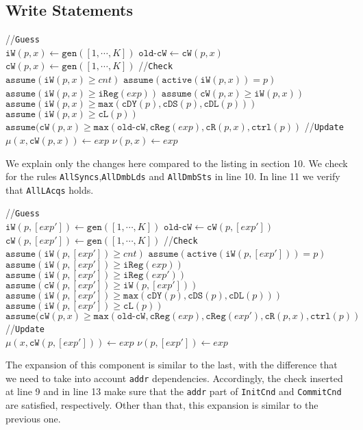 \documentclass{article}
\newcommand{\var}{\texttt}
\begin{document}
\subsection{Write Statements}
\begin{algorithm}[H]
  \SetAlgoLined
  //\var{Guess}\\
  $\var{iW}(p,x) \gets \var{gen}([1,\cdots,K])$\;
  $\var{old-cW} \gets \var{cW}(p,x)$\;
  $\var{cW}(p,x) \gets \var{gen}([1,\cdots,K])$\;
  //\var{Check}\\
  $\var{assume}(\var{iW}(p,x) \geq cnt)$\;
  $\var{assume}(\var{active}(\var{iW}(p,x)) = p)$\;
  $\var{assume}(\var{iW}(p,x) \geq \var{iReg}(exp))$\;
  $\var{assume}(\var{cW}(p,x) \geq \var{iW}(p,x))$\;
  $\var{assume}(\var{iW}(p,x) \geq \var{max}(\var{cDY}(p),\var{cDS}(p),\var{cDL}(p)))$\;
  $\var{assume}(\var{iW}(p,x) \geq \var{cL}(p))$\;
  $\var{assume}(\var{cW}(p,x) \geq \var{max}(\var{old-cW},\var{cReg}(exp),\var{cR}(p,x),\var{ctrl}(p))$\;
  //\var{Update}\\
  $\mu(x,\var{cW}(p,x)) \gets exp$\;
  $\nu(p,x) \gets exp$\;
  \caption{$\llbracket x \leftarrow exp\rrbracket_K^{p,\var{Write}}$}
\end{algorithm}
We explain only the changes here compared to the listing in section 10. We check for the rules \var{AllSyncs},\var{AllDmbLds} and \var{AllDmbSts} in line 10. In line 11 we verify that \var{AllLAcqs} holds.\\
\begin{algorithm}[H]
  \SetAlgoLined
  //\var{Guess}\\
  $\var{iW}(p,[exp']) \gets \var{gen}([1,\cdots,K])$\;
  $\var{old-cW} \gets \var{cW}(p,[exp'])$\;
  $\var{cW}(p,[exp']) \gets \var{gen}([1,\cdots,K])$\;
  //\var{Check}\\
  $\var{assume}(\var{iW}(p,[exp']) \geq cnt)$\;
  $\var{assume}(\var{active}(\var{iW}(p,[exp'])) = p)$\;
  $\var{assume}(\var{iW}(p,[exp']) \geq \var{iReg}(exp))$\;
  $\var{assume}(\var{iW}(p,[exp']) \geq \var{iReg}(exp'))$\;
  $\var{assume}(\var{cW}(p,[exp']) \geq \var{iW}(p,[exp']))$\;
  $\var{assume}(\var{iW}(p,[exp']) \geq \var{max}(\var{cDY}(p),\var{cDS}(p),\var{cDL}(p)))$\;
  $\var{assume}(\var{iW}(p,[exp']) \geq \var{cL}(p))$\;
  $\var{assume}(\var{cW}(p,x) \geq \var{max}(\var{old-cW},\var{cReg}(exp),\var{cReg}(exp'),\var{cR}(p,x),\var{ctrl}(p))$\;
  //\var{Update}\\
  $\mu(x,\var{cW}(p,[exp'])) \gets exp$\;
  $\nu(p,[exp']) \gets exp$\;
  \caption{$\llbracket [exp'] \leftarrow exp\rrbracket_K^{p,\var{Write}}$}
\end{algorithm}
The expansion of this component is similar to the last, with the difference that we need to take into account \var{addr} dependencies. Accordingly, the check inserted at line 9 and in line 13 make sure that the \var{addr} part of \var{InitCnd} and \var{CommitCnd} are satisfied, respectively. Other than that, this expansion is similar to the previous one.
\end{document}
